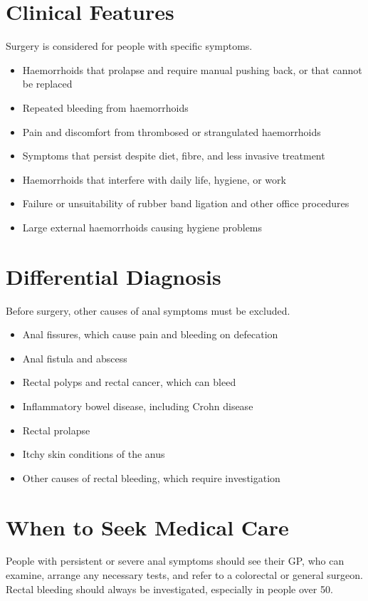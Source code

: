 \section*{Clinical Features}
Surgery is considered for people with specific symptoms.

\begin{itemize}
    \item Haemorrhoids that prolapse and require manual pushing back, or that cannot be replaced
    \item Repeated bleeding from haemorrhoids
    \item Pain and discomfort from thrombosed or strangulated haemorrhoids
    \item Symptoms that persist despite diet, fibre, and less invasive treatment
    \item Haemorrhoids that interfere with daily life, hygiene, or work
    \item Failure or unsuitability of rubber band ligation and other office procedures
    \item Large external haemorrhoids causing hygiene problems
\end{itemize}

\section*{Differential Diagnosis}
Before surgery, other causes of anal symptoms must be excluded.

\begin{itemize}
    \item Anal fissures, which cause pain and bleeding on defecation
    \item Anal fistula and abscess
    \item Rectal polyps and rectal cancer, which can bleed
    \item Inflammatory bowel disease, including Crohn disease
    \item Rectal prolapse
    \item Itchy skin conditions of the anus
    \item Other causes of rectal bleeding, which require investigation
\end{itemize}

\section*{When to Seek Medical Care}
People with persistent or severe anal symptoms should see their GP, who can examine, arrange any necessary tests, and refer to a colorectal or general surgeon. Rectal bleeding should always be investigated, especially in people over 50.


